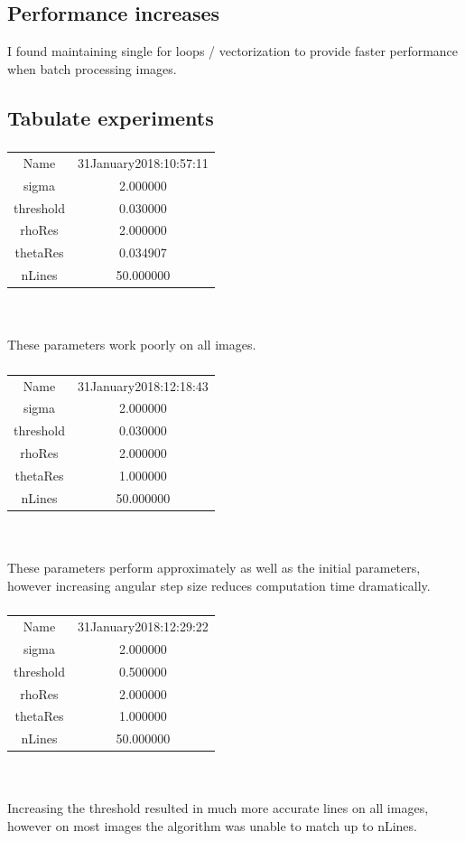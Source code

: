 \documentclass[12pt]{article}
\begin{document}
\newpage
\subsection{Performance increases}
I found maintaining single for loops / vectorization to provide faster performance when batch processing images.

\newpage
\subsection{Tabulate experiments}

\subsubsection{}
\begin{tabular} { c c }
Name  &  31January2018:10:57:11 \\
sigma  &  2.000000 \\
threshold  &  0.030000 \\
rhoRes & 2.000000 \\
thetaRes & 0.034907 \\
nLines & 50.000000 
\end{tabular}
\\ \\
These parameters work poorly on all images.

\subsubsection{}
\begin{tabular} { c c }
Name & 31January2018:12:18:43\\
sigma & 2.000000\\
threshold & 0.030000\\
rhoRes & 2.000000\\
thetaRes & 1.000000\\
nLines & 50.000000
\end{tabular}
\\ \\
These parameters perform approximately as well as the initial parameters, however increasing angular step size reduces computation time dramatically.

\subsubsection{}
\begin{tabular} { c c }
Name & 31January2018:12:29:22\\
sigma & 2.000000\\
threshold & 0.500000\\
rhoRes & 2.000000\\
thetaRes & 1.000000\\
nLines & 50.000000
\end{tabular}
\\ \\
Increasing the threshold resulted in much more accurate lines on all images, however on most images the algorithm was unable to match up to nLines.
\end{document}
